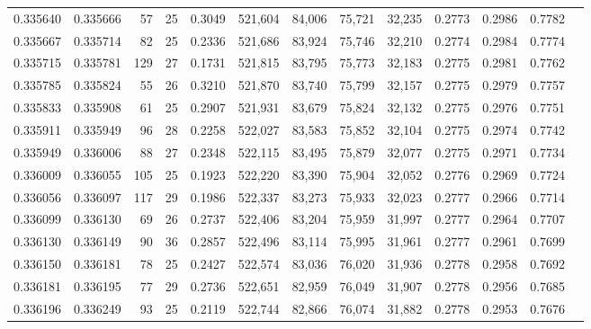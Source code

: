 \begin{tabular}{rrrrrrrrrrrrr}
0.335640 & 0.335666 &    57 &  25 &                                     0.3049 & 521,604 &  84,006 &  75,721 &  32,235 & 0.2773 & 0.2986 & 0.7782 \\
0.335667 & 0.335714 &    82 &  25 &                                     0.2336 & 521,686 &  83,924 &  75,746 &  32,210 & 0.2774 & 0.2984 & 0.7774 \\
0.335715 & 0.335781 &   129 &  27 &                                     0.1731 & 521,815 &  83,795 &  75,773 &  32,183 & 0.2775 & 0.2981 & 0.7762 \\
0.335785 & 0.335824 &    55 &  26 &                                     0.3210 & 521,870 &  83,740 &  75,799 &  32,157 & 0.2775 & 0.2979 & 0.7757 \\
0.335833 & 0.335908 &    61 &  25 &                                     0.2907 & 521,931 &  83,679 &  75,824 &  32,132 & 0.2775 & 0.2976 & 0.7751 \\
0.335911 & 0.335949 &    96 &  28 &                                     0.2258 & 522,027 &  83,583 &  75,852 &  32,104 & 0.2775 & 0.2974 & 0.7742 \\
0.335949 & 0.336006 &    88 &  27 &                                     0.2348 & 522,115 &  83,495 &  75,879 &  32,077 & 0.2775 & 0.2971 & 0.7734 \\
0.336009 & 0.336055 &   105 &  25 &                                     0.1923 & 522,220 &  83,390 &  75,904 &  32,052 & 0.2776 & 0.2969 & 0.7724 \\
0.336056 & 0.336097 &   117 &  29 &                                     0.1986 & 522,337 &  83,273 &  75,933 &  32,023 & 0.2777 & 0.2966 & 0.7714 \\
0.336099 & 0.336130 &    69 &  26 &                                     0.2737 & 522,406 &  83,204 &  75,959 &  31,997 & 0.2777 & 0.2964 & 0.7707 \\
0.336130 & 0.336149 &    90 &  36 &                                     0.2857 & 522,496 &  83,114 &  75,995 &  31,961 & 0.2777 & 0.2961 & 0.7699 \\
0.336150 & 0.336181 &    78 &  25 &                                     0.2427 & 522,574 &  83,036 &  76,020 &  31,936 & 0.2778 & 0.2958 & 0.7692 \\
0.336181 & 0.336195 &    77 &  29 &                                     0.2736 & 522,651 &  82,959 &  76,049 &  31,907 & 0.2778 & 0.2956 & 0.7685 \\
0.336196 & 0.336249 &    93 &  25 &                                     0.2119 & 522,744 &  82,866 &  76,074 &  31,882 & 0.2778 & 0.2953 & 0.7676 \\

\end{tabular}
